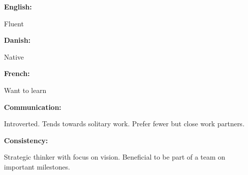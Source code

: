 \documentclass[9pt]{developercv} %
\begin{document}
\begin{minipage}[t]{0.46\textwidth}
    \vspace{-6pt}
    
	\begin{minipage}{0.28\textwidth}
    \textbf{English:} 
	\end{minipage}
	\hfill
	\begin{minipage}{0.65\textwidth}
		Fluent
	\end{minipage}

	\vspace{4mm}
	
	\begin{minipage}{0.28\textwidth}
		\textbf{Danish:}
	\end{minipage}
	\hfill
	\begin{minipage}{0.65\textwidth}
		Native
	\end{minipage}

	\vspace{4mm}
	
	\begin{minipage}{0.28\textwidth}
		\textbf{French:}
	\end{minipage}
	\hfill
	\begin{minipage}{0.65\textwidth}
		Want to learn
	\end{minipage}
\end{minipage}
\hfill
\begin{minipage}[t]{0.465\textwidth}
    \vspace{-6pt}

	\begin{minipage}[t]{0.28\textwidth}
		\textbf{Communication:}
	\end{minipage}
	\hfill
	\begin{minipage}[t]{0.65\textwidth}
		Introverted. Tends towards solitary work. Prefer fewer but close work partners.
	\end{minipage}

	\vspace{4mm}

	\begin{minipage}[t]{0.28\textwidth}
		\textbf{Consistency:}
	\end{minipage}
	\hfill
	\begin{minipage}[t]{0.65\textwidth}
		Strategic thinker with focus on vision. Beneficial to be part of a team on important milestones.
	\end{minipage}

\end{minipage}

\end{document}
